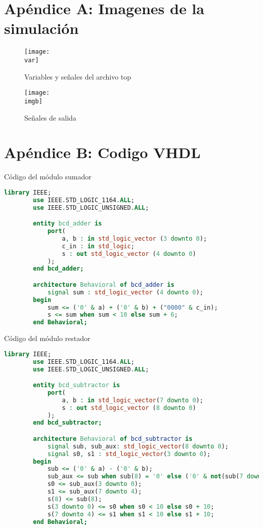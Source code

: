 \documentclass[a4paper, 12pt]{article}
\newcommand{\var}{img/variables.jpeg}
\newcommand{\imgb}{img/diagrama2.png}
\begin{document}
    \appendix
    \section*{Apéndice A: Imagenes de la simulación}
    \begin{figure}[H]
        \centering
        \texttt{[image: \\var]}
        \caption{Variables y señales del archivo top}
        \label{fig:variables}
    \end{figure}

    \begin{figure}[H]
        \centering
        \texttt{[image: \\imgb]}
        \caption{Señales de salida}
        \label{fig:signal}
    \end{figure} 

    \section*{Apéndice B: Codigo VHDL}
    Código del módulo sumador
    \begin{lstlisting}[language=VHDL]
        library IEEE;
        use IEEE.STD_LOGIC_1164.ALL;
        use IEEE.STD_LOGIC_UNSIGNED.ALL;

        entity bcd_adder is
            port(
                a, b : in std_logic_vector (3 downto 0);
                c_in : in std_logic;
                s : out std_logic_vector (4 downto 0)
            );
        end bcd_adder;

        architecture Behavioral of bcd_adder is
            signal sum : std_logic_vector (4 downto 0);
        begin
            sum <= ('0' & a) + ('0' & b) + ("0000" & c_in);
            s <= sum when sum < 10 else sum + 6;
        end Behavioral;
    \end{lstlisting}

    Código del módulo restador
    \begin{lstlisting}[language=VHDL]
        library IEEE;
        use IEEE.STD_LOGIC_1164.ALL;
        use IEEE.STD_LOGIC_UNSIGNED.ALL;

        entity bcd_subtractor is
            port(
                a, b : in std_logic_vector(7 downto 0);
                s : out std_logic_vector (8 downto 0)
            );
        end bcd_subtractor;

        architecture Behavioral of bcd_subtractor is
            signal sub, sub_aux: std_logic_vector(8 downto 0);
            signal s0, s1 : std_logic_vector(3 downto 0);
        begin
            sub <= ('0' & a) - ('0' & b);
            sub_aux <= sub when sub(8) = '0' else ('0' & not(sub(7 downto 0))) + 1;
            s0 <= sub_aux(3 downto 0);
            s1 <= sub_aux(7 downto 4);
            s(8) <= sub(8);
            s(3 downto 0) <= s0 when s0 < 10 else s0 + 10;
            s(7 downto 4) <= s1 when s1 < 10 else s1 + 10;
        end Behavioral;
    \end{lstlisting}
\end{document}
